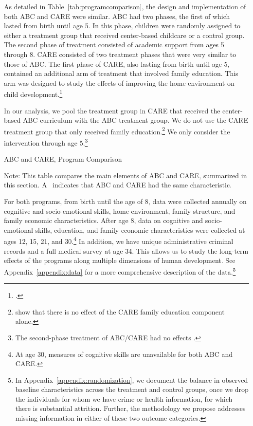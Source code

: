 As detailed in Table~\ref{tab:programcomparison}, the design and implementation of both ABC and CARE were similar. ABC had two phases, the first of which lasted from birth until age 5. In this phase, children were randomly assigned to either a treatment group that received center-based childcare or a control group. The second phase of treatment consisted of academic support from ages 5 through 8. CARE consisted of two treatment phases that were very similar to those of ABC. The first phase of CARE, also lasting from birth until age 5, contained an additional arm of treatment that involved family education. This arm was designed to study the effects of improving the home environment on child development.\footnote{\citet{Wasik_Ramey_etal_1990_CD}.}

In our analysis, we pool the treatment group in CARE that received the center-based ABC curriculum with the ABC treatment group. We do not use the CARE treatment group that only received family education.\footnote{\citet{ABCCARE_Dataset} show that there is no effect of the CARE family education component alone.} We only consider the intervention through age 5.\footnote{The second-phase treatment of ABC/CARE had no effects \citep{ABCCARE_Dataset}.}

\begin{table}[htbp]
\centering
\caption{ABC and CARE, Program Comparison} \label{tab:programcomparison}
\begin{adjustbox}{max width=\textwidth}
\begin{threeparttable}
	
\begin{tablenotes}
\footnotesize
\item Note: This table compares the main elements of ABC and CARE, summarized in this section. A \checkmark\ indicates that ABC and CARE had the same characteristic.
\end{tablenotes}
\end{threeparttable}
\end{adjustbox}
\end{table}


For both programs, from birth until the age of 8, data were collected annually on cognitive and socio-emotional skills, home environment, family structure, and family economic characteristics. After age 8, data on cognitive and socio-emotional skills, education, and family economic characteristics were collected at ages 12, 15, 21, and 30.\footnote{At age 30, measures of cognitive skills are unavailable for both ABC and CARE.} In addition, we have unique administrative criminal records and a full medical survey at age 34. This allows us to study the long-term effects of the programs along multiple dimensions of human development. See Appendix~\ref{appendix:data} for a more comprehensive description of the data.\footnote{In Appendix~\ref{appendix:randomization}, we document the balance in observed baseline characteristics across the treatment and control groups, once we drop the individuals for whom we have crime or health information, for which there is substantial attrition. Further, the methodology we propose addresses missing information in either of these two outcome categories.}

